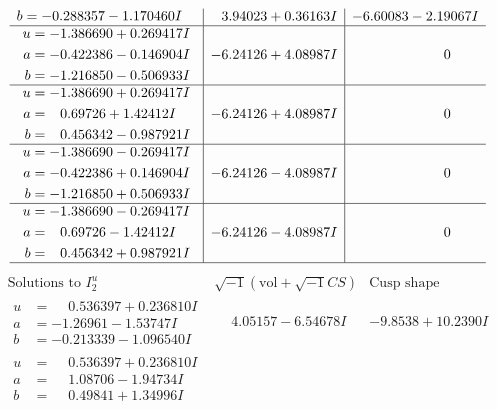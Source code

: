 \documentclass[1p]{elsarticle_modified}
\theoremstyle{definition}
\newcommand{\I}{\sqrt{-1}}
\begin{document}
$$\begin{array}{c|c|c}
\begin{aligned}
b &= -0.288357 - 1.170460 I\end{aligned}
 & \phantom{-}3.94023 + 0.36163 I & -6.60083 - 2.19067 I \\ \hline\begin{aligned}
u &= -1.386690 + 0.269417 I \\
a &= -0.422386 - 0.146904 I \\
b &= -1.216850 - 0.506933 I\end{aligned}
 & -6.24126 + 4.08987 I & \phantom{-0.000000 } 0 \\ \hline\begin{aligned}
u &= -1.386690 + 0.269417 I \\
a &= \phantom{-}0.69726 + 1.42412 I \\
b &= \phantom{-}0.456342 - 0.987921 I\end{aligned}
 & -6.24126 + 4.08987 I & \phantom{-0.000000 } 0 \\ \hline\begin{aligned}
u &= -1.386690 - 0.269417 I \\
a &= -0.422386 + 0.146904 I \\
b &= -1.216850 + 0.506933 I\end{aligned}
 & -6.24126 - 4.08987 I & \phantom{-0.000000 } 0 \\ \hline\begin{aligned}
u &= -1.386690 - 0.269417 I \\
a &= \phantom{-}0.69726 - 1.42412 I \\
b &= \phantom{-}0.456342 + 0.987921 I\end{aligned}
 & -6.24126 - 4.08987 I & \phantom{-0.000000 } 0\\
 \hline 
 \end{array}$$\newpage$$\begin{array}{c|c|c}  
\text{Solutions to }I^u_{2}& \I (\text{vol} + \sqrt{-1}CS) & \text{Cusp shape}\\
 \hline 
\begin{aligned}
u &= \phantom{-}0.536397 + 0.236810 I \\
a &= -1.26961 - 1.53747 I \\
b &= -0.213339 - 1.096540 I\end{aligned}
 & \phantom{-}4.05157 - 6.54678 I & -9.8538 + 10.2390 I \\ \hline\begin{aligned}
u &= \phantom{-}0.536397 + 0.236810 I \\
a &= \phantom{-}1.08706 - 1.94734 I \\
b &= \phantom{-}0.49841 + 1.34996 I\end{aligned}

\end{array}$$
\end{document}
